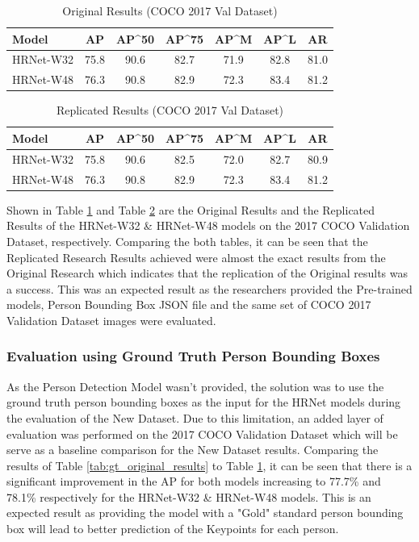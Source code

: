 \documentclass[a4paper,12pt]{article}
\begin{document}
\begin{table}[h]
\centering
\begin{tabular}{ l | c | c | c | c | c | c}
    Model & AP & AP^{50} & AP^{75} & AP^{M} & AP^{L} & AR \\
    \hline \hline
    HRNet-W32 & 75.8 & 90.6 & 82.7 & 71.9 & 82.8 & 81.0 \\
    HRNet-W48 & 76.3 & 90.8 & 82.9 & 72.3 & 83.4 & 81.2 \\
\end{tabular}
\caption{Original Results (COCO 2017 Val Dataset)}
\label{tab:orig_results}
\end{table}

\begin{table}[h]
\centering
\begin{tabular}{ l | c | c | c | c | c | c}
    Model & AP & AP^{50} & AP^{75} & AP^{M} & AP^{L} & AR \\
    \hline \hline
    HRNet-W32 & 75.8 & 90.6 & 82.5 & 72.0 & 82.7 & 80.9 \\
    HRNet-W48 & 76.3 & 90.8 & 82.9 & 72.3 & 83.4 & 81.2 \\
\end{tabular}
\caption{Replicated Results (COCO 2017 Val Dataset)}
\label{tab:replicated_results}
\end{table}

Shown in Table \ref{tab:orig_results} and Table \ref{tab:replicated_results} are the Original Results and the Replicated Results of the HRNet-W32 \& HRNet-W48 models on the 2017 COCO Validation Dataset, respectively. Comparing the both tables, it can be seen that the Replicated Research Results achieved were almost the exact results from the Original Research which indicates that the replication of the Original results was a success. This was an expected result as the researchers provided the Pre-trained models, Person Bounding Box JSON file and the same set of COCO 2017 Validation Dataset images were evaluated.\par

\subsubsection*{Evaluation using Ground Truth Person Bounding Boxes}

As the Person Detection Model wasn't provided, the solution was to use the ground truth person bounding boxes as the input for the HRNet models during the evaluation of the New Dataset. Due to this limitation, an added layer of evaluation was performed on the 2017 COCO Validation Dataset which will be serve as a baseline comparison for the New Dataset results. Comparing the results of Table \ref{tab:gt_original_results} to Table \ref{tab:orig_results}, it can be seen that there is a significant improvement in the AP for both models increasing to 77.7\% and 78.1\% respectively for the HRNet-W32 \& HRNet-W48 models. This is an expected result as providing the model with a "Gold" standard person bounding box will lead to better prediction of the Keypoints for each person.
\end{document}
